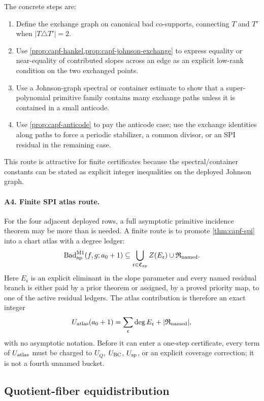 \documentclass[11pt]{article}
\theoremstyle{definition}
\theoremstyle{remark}
\providecommand{\Bad}{\operatorname{Bad}}
\begin{document}
The concrete steps are:
\begin{enumerate}[label=\textup{A3.\arabic*},leftmargin=3.0em]
\item Define the exchange graph on canonical bad co-supports, connecting $T$ and $T'$ when $|T\triangle T'|=2$.
\item Use \cref{prop:capf-hankel,prop:capf-johnson-exchange} to express equality or near-equality of contributed slopes across an edge as an explicit low-rank condition on the two exchanged points.
\item Use a Johnson-graph spectral or container estimate to show that a super-polynomial primitive family contains many exchange paths unless it is contained in a small anticode.
\item Use \cref{prop:capf-anticode} to pay the anticode case; use the exchange identities along paths to force a periodic stabilizer, a common divisor, or an SPI residual in the remaining case.
\end{enumerate}

This route is attractive for finite certificates because the spectral/container constants can be stated as explicit integer inequalities on the deployed Johnson graph.

\paragraph{A4. Finite SPI atlas route.}
For the four adjacent deployed rows, a full asymptotic primitive incidence theorem may be more than is needed.  A finite route is to promote \cref{thm:capf-spi} into a chart atlas with a degree ledger:
\[
        \Bad_{\rm ap}^{\rm M1}(f,g;a_0+1)
        \subseteq
        \bigcup_{\mathfrak c\in\mathfrak C_{\rm ap}} Z(E_{\mathfrak c})
        \cup \mathfrak R_{\rm named} .
\]
Here $E_{\mathfrak c}$ is an explicit eliminant in the slope parameter and every named residual branch is either paid by a prior theorem or assigned, by a proved priority map, to one of the active residual ledgers.  The atlas contribution is therefore an exact integer
\[
        U_{\rm atlas}(a_0+1)=\sum_{\mathfrak c}\deg E_{\mathfrak c}+|\mathfrak R_{\rm named}|,
\]
with no asymptotic notation.  Before it can enter a one-step certificate, every term of $U_{\rm atlas}$ must be charged to $U_Q$, $U_{\rm BC}$, $U_{\rm sp}$, or an explicit coverage correction; it is not a fourth unnamed bucket.

\subsection{Quotient-fiber equidistribution}\label{subsec:capfaq-Q-strategies}
\end{document}
